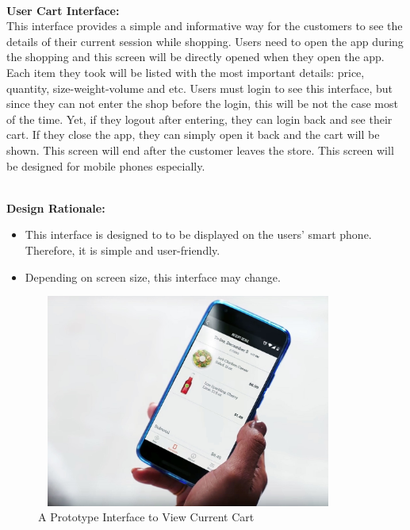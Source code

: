 \documentclass[11pt]{article}
\begin{document}
    \textbf{\\User Cart Interface:\\}
    This interface provides a simple and informative way for
    the customers to see the details of their current session while shopping. Users need
    to open the app during the shopping and this screen will be directly opened when
    they open the app. Each item they took will be listed with the most important
    details: price, quantity, size-weight-volume and etc. Users must login to see this
    interface, but since they can not enter the shop before the login, this will be not the
    case most of the time. Yet, if they logout after entering, they can login back and see
    their cart. If they close the app, they can simply open it back and the cart will be
    shown. This screen will end after the customer leaves the store. This screen will be 
    designed for mobile phones especially.
    
    \textbf{\\Design Rationale:}
    \begin{itemize}
       \item This interface is designed to to be displayed on the users' smart phone. Therefore, it is simple and user-friendly.
       \item Depending on screen size, this interface may change. 
    \end{itemize}

    \begin{center}
        \begin{figure}[H]
            \centering
            \includegraphics[width = 10cm, height = 7cm]{Images/CartInfo.png}
            \caption{A Prototype Interface to View Current Cart}  
            \label{ccartinfo}
        \end{figure}
    \end{center}
\end{document}
